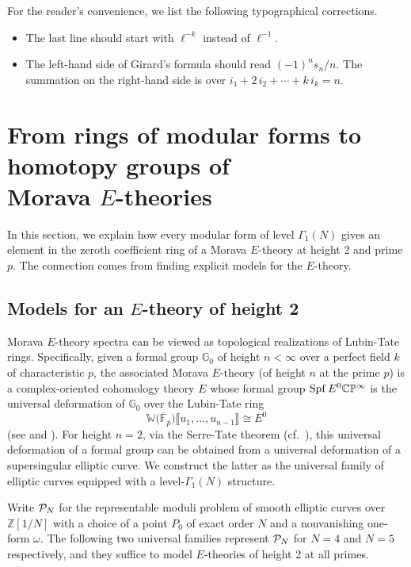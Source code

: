 \documentclass{gtpart}
\theoremstyle{definition}
\theoremstyle{remark}
\newcommand{\mb}[1]{\mathbb{#1}}
\newcommand{\Spf}{{\rm Spf\thinspace}}
\newcommand{\cF}{\overline {\mb F}}
\newcommand{\CP}{{\cal P}}
\newcommand{\BC}{{\mb C}}
\newcommand{\BG}{{\mb G}}
\newcommand{\BP}{{\mb P}}
\newcommand{\BW}{{\mb W}}
\newcommand{\BZ}{{\mb Z}}
\newcommand{\G}{\Gamma}
\renewcommand{\o}{\omega}
\newcommand{\lb}{\llbracket}
\newcommand{\rb}{\rrbracket}
\renewcommand{\=}{\approx}
\renewcommand{\-}{\sim}
\numberwithin{equation}{section}
\begin{document}
For the reader's convenience, we list the following typographical corrections.  
\begin{itemize}
 \item \cite[(1.11.0.4)]{padicprop} The last line should start with $\ell^{-k}$ 
 instead of $\ell^{-1}$.  

 \item \cite[Problem 16-A]{cc} The left-hand side of Girard's formula should 
 read $(-1)^n s_n / n$.  The summation on the right-hand side is over 
 $i_1 + 2\,i_2 + \cdots + k\,i_k = n$.  
\end{itemize}



\section{From rings of modular forms to homotopy groups of\\
         Morava $E$-theories}
\label{sec:mf2E}

In this section, we explain how every modular form of level $\G_1(N)$ gives an 
element in the zeroth coefficient ring of a Morava $E$-theory at height 2 and 
prime $p$.  The connection comes from finding explicit models for the 
$E$-theory.  



\subsection{Models for an $E$-theory of height 2}
\label{subsec:model}

Morava $E$-theory spectra can be viewed as topological realizations of 
Lubin-Tate rings.  Specifically, given a formal group $\BG_0$ of height 
$n < \infty$ over a perfect field $k$ of characteristic $p$, the associated 
Morava $E$-theory (of height $n$ at the prime $p$) is a complex-oriented 
cohomology theory $E$ whose formal group $\Spf E^0 \BC\BP^\infty$ is the 
universal deformation of $\BG_0$ over the Lubin-Tate ring 
\[
 \BW \big( \cF_p \big) \lb u_1, \ldots, u_{n - 1} \rb \cong E^0 
\]
(see \cite[Section 3]{LT} and \cite[Section 7]{GH}).  For height $n = 2$, via 
the Serre-Tate theorem \cite{LST} (cf.~\cite[Theorem 2.9.1]{KM}), this universal 
deformation of a formal group can be obtained from a universal deformation of a 
supersingular elliptic curve.  We construct the latter as the universal family 
of elliptic curves equipped with a level-$\G_1(N)$ structure.  

Write $\CP_N$ for the representable moduli problem of smooth elliptic curves 
over $\BZ[1/N]$ with a choice of a point $P_0$ of exact order $N$ and a 
nonvanishing one-form $\o$.  The following two universal families represent 
$\CP_N$ for $N = 4$ and $N = 5$ respectively, and they suffice to model 
$E$-theories of height 2 at all primes.  
\end{document}
